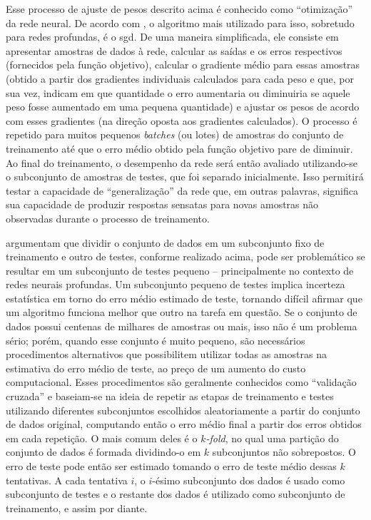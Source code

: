 Esse processo de ajuste de pesos descrito acima é conhecido como ``otimização'' da rede neural. De acordo com , o algoritmo mais utilizado para isso, sobretudo para redes profundas, é o \acrfull{sgd}.
De uma maneira simplificada, ele consiste em apresentar amostras de dados à rede, calcular as saídas e os erros respectivos (fornecidos pela função objetivo), calcular o gradiente médio para essas amostras (obtido a partir dos gradientes individuais calculados para cada peso e que, por sua vez, indicam em que quantidade o erro aumentaria ou diminuiria se aquele peso fosse aumentado em uma pequena quantidade) e ajustar os pesos de acordo com esses gradientes (na direção oposta aos gradientes calculados). 
O processo é repetido para muitos pequenos \textit{batches} (ou lotes) de amostras do conjunto de treinamento até que o erro médio obtido pela função objetivo pare de diminuir. 
Ao final do treinamento, o desempenho da rede será então avaliado utilizando-se o subconjunto de amostras de testes, que foi separado inicialmente. Isso permitirá testar a capacidade de ``generalização'' da rede que, em outras palavras, significa sua capacidade de produzir respostas sensatas para novas amostras não observadas durante o processo de treinamento.


 argumentam que dividir o conjunto de dados em um subconjunto fixo de treinamento e outro de testes, conforme realizado acima, pode ser problemático se resultar em um subconjunto de testes pequeno -- principalmente no contexto de redes neurais profundas.
Um subconjunto pequeno de testes implica incerteza estatística em torno do erro médio estimado de teste, tornando difícil afirmar que um algoritmo funciona melhor que outro na tarefa em questão.
Se o conjunto de dados possui centenas de milhares de amostras ou mais, isso não é um problema sério; porém, quando esse conjunto é muito pequeno, são necessários procedimentos alternativos que possibilitem utilizar todas as amostras na estimativa do erro médio de teste, ao preço de um aumento do custo computacional.
Esses procedimentos são geralmente conhecidos como ``validação cruzada'' e baseiam-se na ideia de repetir as etapas de treinamento e testes utilizando diferentes subconjuntos escolhidos aleatoriamente a partir do conjunto de dados original, computando então o erro médio final a partir dos erros obtidos em cada repetição. 
O mais comum deles é o \textit{\(k\)-fold}, no qual uma partição do conjunto de dados é formada dividindo-o em \(k\) subconjuntos não sobrepostos. O erro de teste pode então ser estimado tomando o erro de teste médio dessas \(k\) tentativas. A cada tentativa \(i\), o \(i\)-ésimo subconjunto dos dados é usado como subconjunto de testes e o restante dos dados é utilizado como subconjunto de treinamento, e assim por diante.

